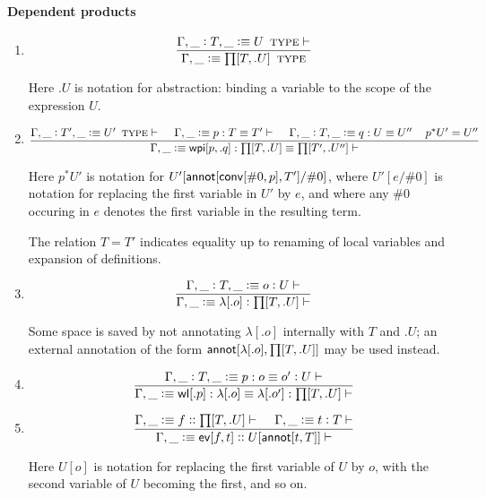 \documentclass[11pt]{article}
\newcommand{\eqd}{\equiv}
\newcommand{\spc}{{\,\,\,\,\,\,\,}}
\newcommand{\ccolon}[1]{\vcentcolon#1}
\newcommand{\ccheck}[1]{\vcentcolon#1}  %
\newcommand{\csynth}[1]{\vcentcolon\vcentcolon #1} %
\newcommand{\Type}{\mathop{\text{ \sc type}}}
\newcommand{\Okay}{\mathop{\text{ \sc okay}}}
\newcommand{\Context}{\vdash\Okay}
\renewcommand{\Context}{\vdash}
\newcommand{\ha}[2]{#1[#2]}
\newcommand{\annot}{{\sf annot}}
\newcommand{\haa}[2]{\ha\annot{#1,#2}}
\newcommand{\conv}{{\sf conv}}
\newcommand{\ev}{{\sf ev}}
\newcommand{\wl}{{\sf wl}}
\newcommand{\wpi}{{\sf wpi}}
\newcommand{\var}{\char`_}
\newcommand{\defn}{\vcentcolon\equiv}
\begin{document}
\paragraph{Dependent products}

\begin{enumerate}

\item 
\[\frac{ \Gamma, \var \ccolon{T}, \var \defn U\Type \Context }{\Gamma, \var \defn \ha\prod{T,.U}\Type}\]

Here $.U$ is notation for abstraction: binding a variable to the scope of the expression $U$.

\item 
\[ \frac{ 
  \Gamma, \var \ccolon{T'}, \var \defn U'  \Type \Context \spc 
  \Gamma, \var \defn p:T \eqd T' \Context \spc
  \Gamma,  \var \ccolon{T}, \var \defn q:U \eqd U'' \spc
  p^*U' = U'' 
  } {
  \Gamma, \var \defn \ha\wpi{p,.q}:\ha\prod{T,.U}\eqd \ha\prod{T',.U''} \Context
}\]

Here ${p}^*U'$ is notation for $U'[\haa {\ha\conv{\#0,p}} {T'} /\#0]$, where
$U'[e/\#0]$ is notation for replacing the first variable in $U'$ by $e$, and
where any $\#0$ occuring in $e$ denotes the first variable in the resulting
term.

The relation $T = T'$ indicates equality up to renaming of local variables and
expansion of definitions.

\item 
\[\frac{
  \Gamma, \var \ccolon{T}, \var\defn o \ccheck{U} \Context
}{\Gamma, \var\defn \ha\lambda{.o} \ccheck{\ha\prod{T,.U}} \Context}
\]

Some space is saved by not annotating $\ha\lambda{.o}$ internally with $T$ and
$.U$; an external annotation of the form $\haa {\ha\lambda{.o}} {\ha\prod{T,.U}} $ may be used instead.

\item 
\[\frac{
  \Gamma, \var \ccolon{T}, \var\defn p : o\eqd o' \ccheck{U} \Context
}{
  \Gamma, \var\defn \ha\wl{.p} : \ha\lambda{.o}\eqd \ha\lambda{.o'} : \ha\prod{T,.U} \Context
}\]

\item 
\[\frac{
  \Gamma, \var\defn f \csynth{\ha\prod{T,.U}} \Context
  \spc 
  \Gamma, \var\defn t \ccheck{T}\Context
}{
  \Gamma, \var\defn \ha\ev{f,t} \csynth{U[\haa t T]} \Context
}\]

Here $U[o]$ is notation for replacing the first variable of $U$ by $o$, with
the second variable of $U$ becoming the first, and so on.  


\end{enumerate}
\end{document}
